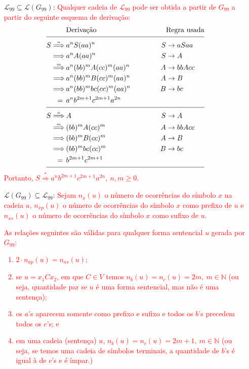 \documentclass[12pt]{article}
\def\myling{{99}} %
\newcommand{\deriv}[1]{\stackrel{\scriptscriptstyle #1}{\Longrightarrow}}
\begin{document}
\begin{itemize}[leftmargin=3.7cm]
 \item [$\mathcal{L}_{\myling} \subseteq\mathcal{L}(G_{99})$:] \textcolor{red}{Qualquer cadeia de $\mathcal{L}_{\myling}$ pode ser obtida a partir de $G_{99}$ a partir do seguinte esquema de derivação:
		\begin{alignat*}{2}
		 & \text{Derivação} & \qquad\qquad& \text{Regra usada}\\[-8pt]
		\cline{1-4}
		 S \deriv{n}\>& a^nS(aa)^n                & S &\to aSaa\\ 
		   \deriv{}\> & a^nA(aa)^n                & S &\to A \\
	       \deriv{m}\>& a^n(bb)^mA(cc)^m(aa)^n    & A &\to bbAcc \\ 
	       \deriv{}\> & a^n(bb)^mB(cc)^m(aa)^n    & A &\to B \\ 
           \deriv{}\> & a^n(bb)^mbc(cc)^m(aa)^n   & B &\to bc \\ 
		        =\>\> & a^nb^{2m+1}c^{2m+1}a^{2n} &  \\[-8pt]
		\cline{1-4}
		 S \deriv{n}\>& A                          &S &\to A \\
	       \deriv{m}\>& (bb)^mA(cc)^m    & A &\to bbAcc \\ 
	       \deriv{}\> & (bb)^mB(cc)^m    & A &\to B \\ 
           \deriv{}\> & (bb)^mbc(cc)^m   & B &\to bc \\ 
		        =\>\> & b^{2m+1}c^{2m+1} &  \\[-8pt]
		\cline{1-4}
		\end{alignat*}
  Portanto, $S \deriv{*}a^nb^{2m+1}c^{2m+1}a^{2n},\> n,m \geqslant 0$.
}

 \item [$\mathcal{L}(G_{99})\subseteq \mathcal{L}_{\myling}$:]  \textcolor{red}{Sejam $n_x(u)$ o número de ocorrências do símbolo $x$ na cadeia $u$, $n_{xp}(u)$ o número de ocorrências do símbolo $x$ como prefixo de $u$ e $n_{xs}(u)$ o número de ocorrências do símbolo $x$ como sufixo de $u$.}

 \textcolor{red}{As relações seguintes são válidas para qualquer forma sentencial $u$ gerada por $G_{99}$:
\begin{enumerate}[label=(\roman*),ref=(\roman*)]
	\item \label{r1} $2\cdot n_{ap}(u) = n_{as}(u)$;
	\item \label{r2} se $u=x_1Cx_2$, em que $C \in V$ temos $n_b(u)=n_c(u)= 2m, \ m \in \mathbb{N}$ (ou seja, quantidade par se $u$ é uma forma sentencial, mas não é uma sentença);
	\item \label{r3} os $a$'s aparecem somente como prefixo e sufixo e todos os $b$'s precedem todos os $c$'s; e
	\item \label{r4} em uma cadeia (sentença) $u$, $n_b(u)=n_c(u)= 2m+1, \ m \in \mathbb{N}$ (ou seja, se temos uma cadeia de símbolos terminais, a quantidade de $b$'s é igual à de $c$'s e é ímpar.)
\end{enumerate}}


\end{itemize}
\end{document}
